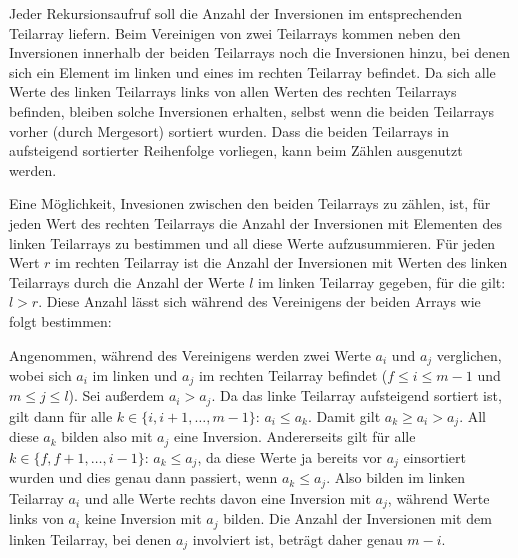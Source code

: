 \documentclass[11pt,a4paper]{article}
\begin{document}
\begin{loesung}
    Jeder Rekursionsaufruf soll die Anzahl der Inversionen im entsprechenden Teilarray liefern.
    Beim Vereinigen von zwei Teilarrays kommen neben den Inversionen innerhalb der beiden Teilarrays noch die Inversionen hinzu, bei denen sich ein Element im linken und eines im rechten Teilarray befindet.
    Da sich alle Werte des linken Teilarrays links von allen Werten des rechten Teilarrays befinden, bleiben solche Inversionen erhalten, selbst wenn die beiden Teilarrays vorher (durch Mergesort) sortiert wurden.
    Dass die beiden Teilarrays in aufsteigend sortierter Reihenfolge vorliegen, kann beim Zählen ausgenutzt werden.

    Eine Möglichkeit, Invesionen zwischen den beiden Teilarrays zu zählen, ist, für jeden Wert des rechten Teilarrays die Anzahl der Inversionen mit Elementen des linken Teilarrays zu bestimmen und all diese Werte aufzusummieren.
    Für jeden Wert $r$ im rechten Teilarray ist die Anzahl der Inversionen mit Werten des linken Teilarrays durch die Anzahl der Werte $l$ im linken Teilarray gegeben, für die gilt: $l > r$.
    Diese Anzahl lässt sich während des Vereinigens der beiden Arrays wie folgt bestimmen:

    Angenommen, während des Vereinigens werden zwei Werte $a_i$ und $a_j$ verglichen, wobei sich $a_i$ im linken und $a_j$ im rechten Teilarray befindet ($f \leq i \leq m - 1$ und $m \leq j \leq l$).
    Sei außerdem $a_i > a_j$.
    Da das linke Teilarray aufsteigend sortiert ist, gilt dann für alle $k \in \{i, i + 1, \ldots,  m - 1\}$: $a_i \leq a_k$.
    Damit gilt $a_k \geq a_i > a_j$.
    All diese $a_k$ bilden also mit $a_j$ eine Inversion.
    Andererseits gilt für alle $k \in \{f, f + 1, \ldots, i - 1\}$: $a_k \leq a_j$, da diese Werte ja bereits vor $a_j$ einsortiert wurden und dies genau dann passiert, wenn $a_k \leq a_j$.
    Also bilden im linken Teilarray $a_i$ und alle Werte rechts davon eine Inversion mit $a_j$, während Werte links von $a_i$ keine Inversion mit $a_j$ bilden.
    Die Anzahl der Inversionen mit dem linken Teilarray, bei denen $a_j$ involviert ist, beträgt daher genau $m - i$.


\end{loesung}
\end{document}
